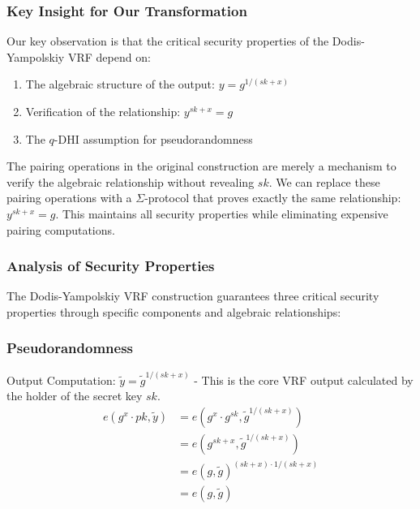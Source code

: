 \subsubsection{Key Insight for Our Transformation}

Our key observation is that the critical security properties of the Dodis-Yampolskiy VRF depend on:
\begin{enumerate}
    \item The algebraic structure of the output: $y = g^{1/(sk+x)}$
    \item Verification of the relationship: $y^{sk+x} = g$
    \item The $q$-DHI assumption for pseudorandomness
\end{enumerate}

The pairing operations in the original construction are merely a mechanism to verify the algebraic relationship without revealing $sk$. We can replace these pairing operations with a $\Sigma$-protocol that proves exactly the same relationship: $y^{sk+x} = g$. This maintains all security properties while eliminating expensive pairing computations.









\subsubsection{Analysis of Security Properties}

The Dodis-Yampolskiy VRF construction guarantees three critical security properties through specific components and algebraic relationships:

\subsubsection*{Pseudorandomness}
Output Computation: $\tilde{y} = \tilde{g}^{1/(sk + x)}$ - This is the core VRF output calculated by the holder of the secret key $sk$.
\begin{align*}
    e(g^{x} \cdot pk, \tilde{y}) &= e(g^{x} \cdot g^{sk}, \tilde{g}^{1/(sk + x)}) \\
    &= e(g^{sk + x}, \tilde{g}^{1/(sk + x)}) \\
    &= e(g, \tilde{g})^{(sk + x) \cdot 1/(sk + x)} \\
    &= e(g, \tilde{g})
\end{align*}

